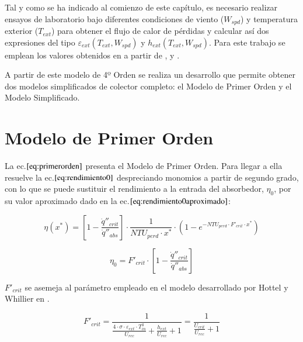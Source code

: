 Tal y como se ha indicado al comienzo de este capítulo, es necesario realizar ensayos de laboratorio bajo diferentes condiciones de viento (\(W_{spd}\)) y temperatura exterior (\(T_{ext}\)) para obtener el flujo de calor de pérdidas y calcular así dos expresiones del tipo \(\varepsilon_{ext}(T_{ext},W_{spd})\) y \(h_{ext}(T_{ext},W_{spd})\). Para este trabajo se emplean los valores obtenidos en \cite{barberofresnoDesarrolloModeloTeorico2018} a partir de \cite{burkholderHeatLossTesting2009}, \cite{burkholderHeatLossTestingSolel2008} y \cite{kutscherGenerationParabolicTrough2012}.

A partir de este modelo de 4º Orden se realiza un desarrollo que permite obtener dos modelos simplificados de colector completo: el Modelo de Primer Orden y el Modelo Simplificado.

\section{Modelo de Primer Orden}

La ec.\(\eqref{eq:primerorden}\) presenta el Modelo de Primer Orden. Para llegar a ella resuelve la ec.\(\eqref{eq:rendimiento0}\) despreciando monomios a partir de segundo grado, con lo que se puede sustituir el rendimiento a la entrada del absorbedor, \(\eta_{0}\), por su valor aproximado dado en la ec.\(\eqref{eq:rendimiento0aproximado}\):

\begin{equation}
    \eta(x^{*}) = \left[1-\frac{\dot q''_{crit}}{\dot q''_{abs}}\right] \cdot \frac{1}{NTU_{perd} \cdot x^{*}} \cdot \left(1-e^{-NTU_{perd}\cdot F'_{crit}\cdot x^{*}}\right) 
    \label{eq:primerorden}
\end{equation}

\begin{equation}
    \eta_{0} = F'_{crit} \cdot \left[1-\frac{\dot q''_{crit}}{\dot q''_{abs}}\right] 
    \label{eq:rendimiento0aproximado}
\end{equation}

 \(F'_{crit}\) se asemeja al parámetro empleado en el modelo desarrollado por Hottel y Whillier en \cite{hottelEvaluationFlatplateSolar1955}.

\begin{equation}
    F'_{crit} = \frac{1}{\frac{4 \cdot \sigma \cdot \varepsilon_{ext} \cdot T^{3}_{in}}{U_{rec}} + \frac{h_{ext}}{U_{rec}} +1} = \frac{1}{\frac{U_{crit}}{U_{rec}}+1}
    \label{eq:fcrit}
\end{equation}

